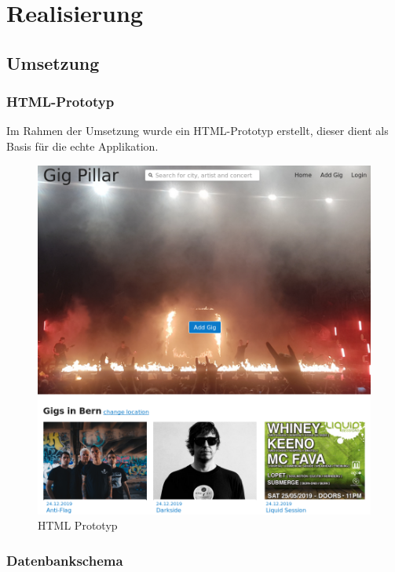 \chapter{Realisierung}

\label{ReportRealisierung}

\section{Umsetzung}

\subsection{HTML-Prototyp}

Im Rahmen der Umsetzung wurde ein HTML-Prototyp erstellt, dieser dient als Basis
für die echte Applikation.

\begin{figure}[!htb]
  \centering
  \includegraphics[width=1\textwidth]{figures/html-prototype.png}
  \caption{HTML Prototyp}
\end{figure}

\subsection{Datenbankschema}

